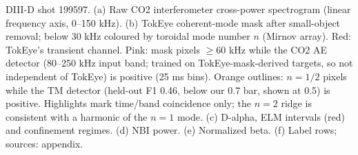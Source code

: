 \caption{DIII-D shot 199597. (a) Raw CO2 interferometer cross-power spectrogram (linear frequency axis, 0--150 kHz). (b) TokEye coherent-mode mask after small-object removal; below 30 kHz coloured by toroidal mode number $n$ (Mirnov array). Red: TokEye's transient channel. Pink: mask pixels $\geq$60 kHz while the CO2 AE detector (80--250 kHz input band; trained on TokEye-mask-derived targets, so not independent of TokEye) is positive (25 ms bins). Orange outlines: $n=1/2$ pixels while the TM detector (held-out F1 0.46, below our 0.7 bar, shown at 0.5) is positive. Highlights mark time/band coincidence only; the $n=2$ ridge is consistent with a harmonic of the $n=1$ mode. (c) D-alpha, ELM intervals (red) and confinement regimes. (d) NBI power. (e) Normalized beta. (f) Label rows; sources: appendix.}
\label{fig:interpreter-199597}
